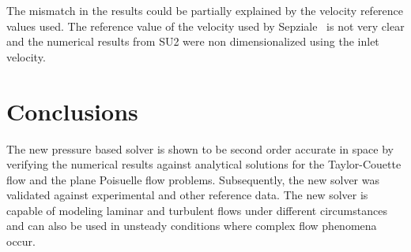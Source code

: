 The mismatch in the results could be partially explained by the velocity reference values used. The reference value of the velocity used by Sepziale~\cite{Speziale1982} is not very clear and the numerical results from SU2 were non dimensionalized using the inlet velocity.
    ~ %

\section{Conclusions}
The new pressure based solver is shown to be second order accurate in space by verifying the numerical results against analytical solutions for the Taylor-Couette flow and the plane Poisuelle flow problems. Subsequently, the new solver was validated against experimental and other reference data. The new solver is capable of modeling laminar and turbulent flows under different circumstances and can also be used in unsteady conditions where complex flow phenomena occur.


